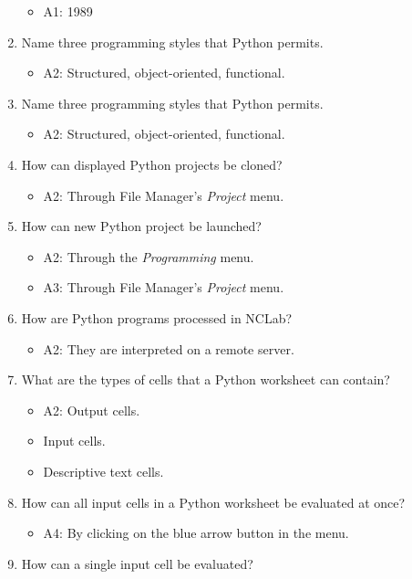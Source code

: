 \documentclass[article,A4,12pt]{llncs}
\begin{document}
\begin{enumerate}
  \begin{itemize}
    \item A1: 1989
  \end{itemize}
\item Name three programming styles that Python permits.
  \begin{itemize}
    \item A2: Structured, object-oriented, functional.
  \end{itemize}
\item Name three programming styles that Python permits.
  \begin{itemize}
    \item A2: Structured, object-oriented, functional.
  \end{itemize}
\item How can displayed Python projects be cloned?
  \begin{itemize}
    \item A2: Through File Manager's {\em Project} menu.
  \end{itemize}
\item How can new Python project be launched?
  \begin{itemize}
    \item A2: Through the {\em Programming} menu.
    \item A3: Through File Manager's {\em Project} menu.
  \end{itemize}
\item How are Python programs processed in NCLab?
  \begin{itemize}
    \item A2: They are interpreted on a remote server.
  \end{itemize}
\item  What are the types of cells that a Python worksheet can contain?
  \begin{itemize}
    \item A2: Output cells.
    \item Input cells.
    \item Descriptive text cells.
  \end{itemize}
\item How can all input cells in a Python worksheet be evaluated at once?
  \begin{itemize}
    \item A4: By clicking on the blue arrow button in the menu.
  \end{itemize}
\item How can a single input cell be evaluated?

\end{enumerate}
\end{document}
